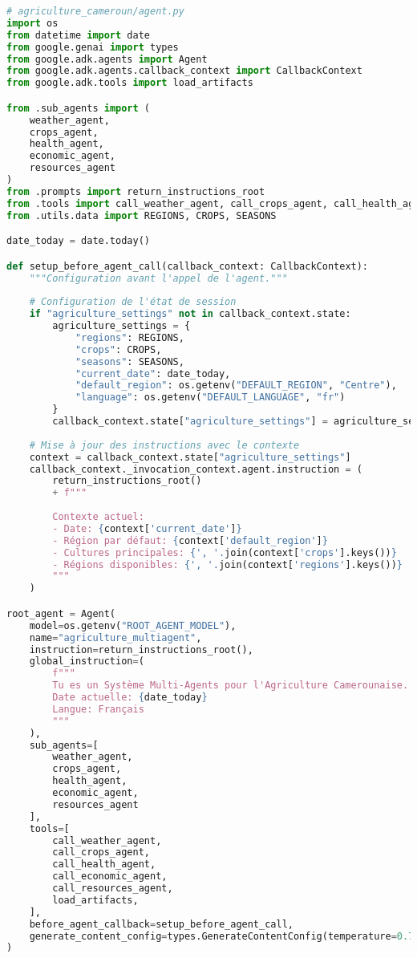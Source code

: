  
\begin{lstlisting}[language=Python, caption=Structure complète de l'agent principal]
# agriculture_cameroun/agent.py
import os
from datetime import date
from google.genai import types
from google.adk.agents import Agent
from google.adk.agents.callback_context import CallbackContext
from google.adk.tools import load_artifacts

from .sub_agents import (
    weather_agent,
    crops_agent,
    health_agent,
    economic_agent,
    resources_agent
)
from .prompts import return_instructions_root
from .tools import call_weather_agent, call_crops_agent, call_health_agent, call_economic_agent, call_resources_agent
from .utils.data import REGIONS, CROPS, SEASONS

date_today = date.today()

def setup_before_agent_call(callback_context: CallbackContext):
    """Configuration avant l'appel de l'agent."""
    
    # Configuration de l'état de session
    if "agriculture_settings" not in callback_context.state:
        agriculture_settings = {
            "regions": REGIONS,
            "crops": CROPS,
            "seasons": SEASONS,
            "current_date": date_today,
            "default_region": os.getenv("DEFAULT_REGION", "Centre"),
            "language": os.getenv("DEFAULT_LANGUAGE", "fr")
        }
        callback_context.state["agriculture_settings"] = agriculture_settings
    
    # Mise à jour des instructions avec le contexte
    context = callback_context.state["agriculture_settings"]
    callback_context._invocation_context.agent.instruction = (
        return_instructions_root()
        + f"""
        
        Contexte actuel:
        - Date: {context['current_date']}
        - Région par défaut: {context['default_region']}
        - Cultures principales: {', '.join(context['crops'].keys())}
        - Régions disponibles: {', '.join(context['regions'].keys())}
        """
    )

root_agent = Agent(
    model=os.getenv("ROOT_AGENT_MODEL"),
    name="agriculture_multiagent",
    instruction=return_instructions_root(),
    global_instruction=(
        f"""
        Tu es un Système Multi-Agents pour l'Agriculture Camerounaise.
        Date actuelle: {date_today}
        Langue: Français
        """
    ),
    sub_agents=[
        weather_agent,
        crops_agent,
        health_agent,
        economic_agent,
        resources_agent
    ],
    tools=[
        call_weather_agent,
        call_crops_agent,
        call_health_agent,
        call_economic_agent,
        call_resources_agent,
        load_artifacts,
    ],
    before_agent_callback=setup_before_agent_call,
    generate_content_config=types.GenerateContentConfig(temperature=0.7),
)
\end{lstlisting}

